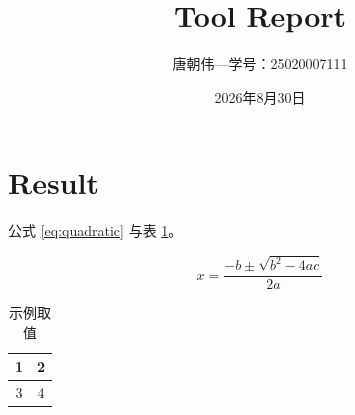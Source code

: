 \documentclass{article}
\begin{document}
\title{Tool Report}
\author{唐朝伟—学号：25020007111}
\date{2026年8月30日}
\maketitle
    
\section{Result}

公式 \eqref{eq:quadratic} 与表 \ref{tab:sample}。

\begin{equation}
    \label{eq:quadratic}
    x = \frac{-b \pm \sqrt{b^2- 4ac}}{2a}
\end{equation}

\begin{table}[h]
    \centering
    \caption{示例取值}
    \label{tab:sample}
    \begin{tabular}{|c|c|}
        \hline
        1 & 2 \\ \hline
        3 & 4 \\ \hline
    \end{tabular}
\end{table}
\end{document}
